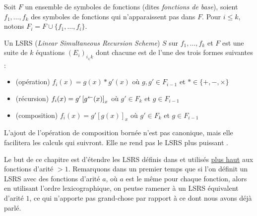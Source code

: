 		
		\begin{definition}[LSRS]
			\label{def:LSRS_2}
			Soit $F$ un ensemble de symboles de fonctions (dites \emph{fonctions de base}), soient $f_1, \dots, f_k$ des symboles de fonctions qui n'apparaissent pas dans $F$. Pour $i\leqslant k$, notons $F_i = F\cup \{f_1, \dots, f_i\}$. 
		
			Un LSRS (\emph{Linear Simultaneous Recursion Scheme}) $S$ sur $f_1, \dots, f_k$ et $F$ est une suite de $k$ équations $\left(E_i\right)_{i_\in k}$ dont chacune est de l'une des trois formes suivantes :
			
			\begin{itemize}[itemsep=-1mm]
				\item 	(opération) 		$f_i(x) = g(x) * g'(x)$ où $g,g' \in F_{i-1}$ et $* \in \{+, -, \times \}$ %
				
				
				\item 	(récursion)			$f_i(x) = g'\left[ g^{\leftarrow}(x) \right]_{x}$ où $g' \in F_k$ et $g \in F_{i-1}$			
				
				\item 	(composition)			$f_i(x) = g'\left[g(x)\right]_x$ où $g' \in F_k$ et $g \in F_{i-1}$
			\end{itemize}
		\end{definition}
		
		\begin{remark}
			L'ajout de l'opération de composition bornée n'est pas canonique, mais elle facilitera les calculs qui suivront. Elle ne rend pas le LSRS plus puissant \cite{GrandjeanSchwentick2002}.
		\end{remark}
		
		\label{rmq:choix_arites}
		Le but de ce chapitre est d'étendre les LSRS définis dans \cite{GrandjeanSchwentick2002} et utilisés \hyperref[def:LSRS]{plus haut} aux fonctions d'arité $>1$. Remarquons dans un premier temps que si l'on définit un LSRS avec des fonctions d'arité $a$, où $a$ est le même pour chaque fonction, alors en utilisant l'ordre lexicographique, on peutse ramener à un LSRS équivalent d'arité $1$, ce qui n'apporte pas grand-chose par rapport à ce dont nous avons déjà parlé.
		
